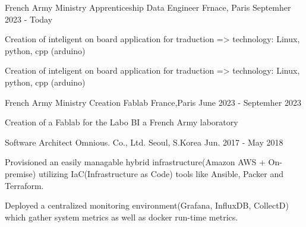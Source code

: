 

\begin{cventries}

  \cventry
    {French Army Ministry} %
    {Apprenticeship Data Engineer} %
    {Frnace, Paris} %
    {Septemher 2023 - Today} %
    {
      \begin{cvitems} %
        \item {Creation of inteligent on board application for traduction => technology: Linux, python, cpp (arduino)}
      \end{cvitems}
    }
    {
      \begin{cvitemsskills} %
        \item {Creation of inteligent on board application for traduction => technology: Linux, python, cpp (arduino)}
      \end{cvitemsskills}
    }

  \cventry
    {French Army Ministry} %
    {Creation Fablab} %
    {France,Paris} %
    {June 2023 - Septemher 2023} %
    {
      \begin{cvitems} %
        \item {Creation of a Fablab for the Labo BI a French Army laboratory}
      \end{cvitems}
    }
    {
    }

  \cventry
    {Software Architect} %
    {Omnious. Co., Ltd.} %
    {Seoul, S.Korea} %
    {Jun. 2017 - May 2018} %
    {
      \begin{cvitems} %
        \item {Provisioned an easily managable hybrid infrastructure(Amazon AWS + On-premise) utilizing IaC(Infrastructure as Code) tools like Ansible, Packer and Terraform.}
        \item {Deployed a centralized monitoring environment(Grafana, InfluxDB, CollectD) which gather system metrics as well as docker run-time metrics.}
      \end{cvitems}
    }
    {}

\end{cventries}
